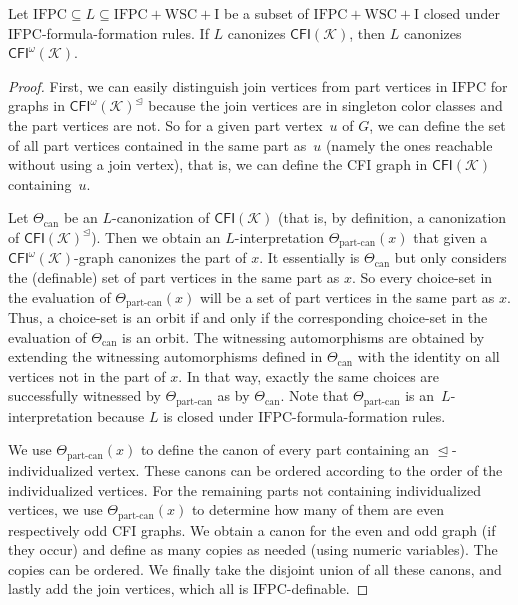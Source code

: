 \documentclass[]{lmcs}
\newcommand{\interpret}{\Theta}
\newcommand{\vertA}{u}
\newcommand{\GraphClass}{\mathcal{K}}
\newcommand{\IFPC}{\ensuremath{\mathrm{IFPC}}}
\newcommand{\IFPCWSCI}{\ensuremath{\mathrm{IFPC{+}WSC{+}I}}}
\newcommand{\CFImsym}{\mathsf{CFI}^\omega}
\newcommand{\CFIm}[1]{\CFImsym(#1)}
\newcommand{\CFIsym}{\mathsf{CFI}}
\newcommand{\CFI}[1]{\CFIsym(#1)}
\newcommand{\indRel}{\trianglelefteq}
\newcommand{\indClosure}[1]{#1^\indRel}
\begin{document}
\begin{lem}
	\label{lem:extended-CFI if-cfi}
	Let $\IFPC{} \subseteq L \subseteq \IFPCWSCI{}$
	be a subset of \IFPCWSCI{}
	closed under \IFPC{}-formula-formation rules.
	If $L$ canonizes  $\CFI{\GraphClass}$,
	then $L$ canonizes $\CFIm{\GraphClass}$.
\end{lem}
\begin{proof}
	First, we can easily distinguish join vertices from part vertices in \IFPC{}
	for graphs in $\indClosure{\CFIm{\GraphClass}}$
	because the join vertices are in singleton color classes and the part vertices are not.
	So for a given part vertex~$\vertA$ of $G$,
	we can define the set of all part vertices contained in the same part as~$\vertA$
	(namely the ones reachable without using a join vertex),
	that is, we can define the CFI graph in $\CFI{\GraphClass}$ containing~$\vertA$.
	
	Let $\interpret_{\text{can}}$ be an $L$-canonization of $\CFI{\GraphClass}$
	(that is, by definition, a canonization of $\indClosure{\CFI{\GraphClass}}$).
	Then we obtain an $L$-interpretation
	$\interpret_{\text{part-can}}(x)$
	that given a $\CFIm{\GraphClass}$-graph canonizes the part of $x$.
	It essentially is $\interpret_{\text{can}}$ but only considers the (definable)
	set of part vertices in the same part as $x$.
	So every choice-set in the evaluation of $\interpret_{\text{part-can}}(x)$
	will be a set of part vertices in the same part as $x$.
	Thus, a choice-set is an orbit if and only if
	the corresponding choice-set in the evaluation of $\interpret_{\text{can}}$ 
	is an orbit.
	The witnessing automorphisms are obtained by extending the
	witnessing automorphisms defined in $\interpret_{\text{can}}$ 
	with the identity on all vertices not in the part of $x$.
	In that way, exactly the same choices are successfully witnessed by
	$\interpret_{\text{part-can}}$ as by  $\interpret_{\text{can}}$.
	Note that $\interpret_{\text{part-can}}$ is an~$L$-interpretation
	because $L$ is closed
	under \IFPC{}-formula-formation rules. 
	
	We use $\interpret_{\text{part-can}}(x)$ to define the canon of every
	part containing an $\indRel$-individualized vertex.
	These canons can be ordered according to the order of the individualized vertices.
	For the remaining parts not containing individualized vertices,
	we use $\interpret_{\text{part-can}}(x)$ to determine how many of 
	them are even respectively odd CFI graphs.
	We obtain a canon for the even and odd graph (if they occur)
	and define as many copies as needed (using numeric variables).
	The copies can be ordered.
	We finally take the disjoint union of all these canons,
	and lastly add the join vertices,
	which all is \IFPC{}-definable.
\end{proof}
\end{document}
